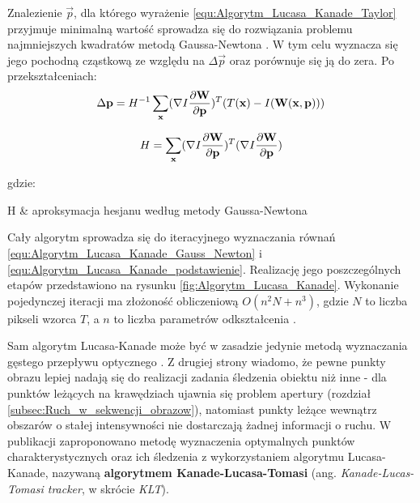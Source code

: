 Znalezienie $\vec{p}$, dla którego wyrażenie \ref{equ:Algorytm_Lucasa_Kanade_Taylor} przyjmuje minimalną wartość sprowadza się do rozwiązania problemu najmniejszych kwadratów metodą Gaussa-Newtona \cite{Baker2004}. W tym celu wyznacza się jego pochodną cząstkową ze względu na $\Delta \vec{p}$ oraz porównuje się ją do zera. Po przekształceniach:
\begin{equation}
\label{equ:Algorytm_Lucasa_Kanade_Gauss_Newton}
	\Delta \mathbf{p} = H^{-1} \sum\limits_{\mathbf{x}}(\nabla I \frac{\partial \mathbf{W}}{\partial \mathbf{p}})^T (T(\mathbf{x}) - I(\mathbf{W}(\mathbf{x}, \mathbf{p})))
\end{equation}

\begin{equation}
\label{equ:Algorytm_Lucasa_Kanade_hesjan}
	H = \sum\limits_{\mathbf{x}}(\nabla I \frac{\partial \mathbf{W}}{\partial \mathbf{p}})^T (\nabla I \frac{\partial \mathbf{W}}{\partial \mathbf{p}})
\end{equation}

\noindent
gdzie:
\begin{conditions}
	H & aproksymacja hesjanu według metody Gaussa-Newtona \\
\end{conditions}

Cały algorytm sprowadza się do iteracyjnego wyznaczania równań \ref{equ:Algorytm_Lucasa_Kanade_Gauss_Newton} i \ref{equ:Algorytm_Lucasa_Kanade_podstawienie}. Realizację jego poszczególnych etapów przedstawiono na rysunku \ref{fig:Algorytm_Lucasa_Kanade}. Wykonanie pojedynczej iteracji ma złożoność obliczeniową $O(n^2 N + n^3)$, gdzie $N$ to liczba pikseli wzorca $T$, a $n$ to liczba parametrów odkształcenia \cite{Baker2004}.

Sam algorytm Lucasa-Kanade może być w zasadzie jedynie metodą wyznaczania gęstego przepływu optycznego \cite{Yilmaz2006}. Z drugiej strony wiadomo, że pewne punkty obrazu lepiej nadają się do realizacji zadania śledzenia obiektu niż inne \cite{Tomasi1991} - dla punktów leżących na krawędziach ujawnia się problem apertury (rozdział \ref{subsec:Ruch_w_sekwencji_obrazow}), natomiast 
punkty leżące wewnątrz obszarów o stałej intensywności nie dostarczają żadnej informacji o ruchu. W publikacji \cite{Tomasi1991} zaproponowano metodę wyznaczenia optymalnych punktów charakterystycznych oraz ich śledzenia z wykorzystaniem algorytmu Lucasa-Kanade, nazywaną \textbf{algorytmem Kanade-Lucasa-Tomasi} (ang. \textit{Kanade-Lucas-Tomasi tracker}, w skrócie \textit{KLT}).

